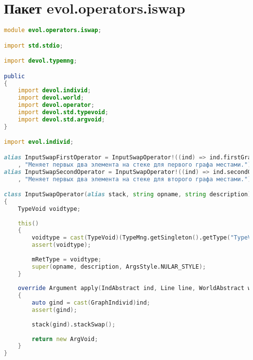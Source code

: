 \documentclass[russian,utf8,emptystyle]{eskdtext}
\begin{document}
\section{Пакет evol.operators.iswap}
\begin{lstlisting}[language=D]
module evol.operators.iswap;

import std.stdio;

import devol.typemng;

public
{
    import devol.individ;
    import devol.world;
    import devol.operator;
    import devol.std.typevoid;
    import devol.std.argvoid;
}

import evol.individ;

alias InputSwapFirstOperator = InputSwapOperator!((ind) => ind.firstGraphStack, "iswap1"
    , "Меняет первых два элемента на стеке для первого графа местами.");  
alias InputSwapSecondOperator = InputSwapOperator!((ind) => ind.secondGraphStack, "iswap2"
    , "Меняет первых два элемента на стеке для второго графа местами.");

class InputSwapOperator(alias stack, string opname, string description) : Operator
{
    TypeVoid voidtype;
    
    this()
    {
        voidtype = cast(TypeVoid)(TypeMng.getSingleton().getType("TypeVoid"));
        assert(voidtype);
        
        mRetType = voidtype;
        super(opname, description, ArgsStyle.NULAR_STYLE);
    }
    
    override Argument apply(IndAbstract ind, Line line, WorldAbstract world)
    {
        auto gind = cast(GraphIndivid)ind;
        assert(gind);
        
        stack(gind).stackSwap();
        
        return new ArgVoid;
    }   
}
\end{lstlisting}
\end{document}
